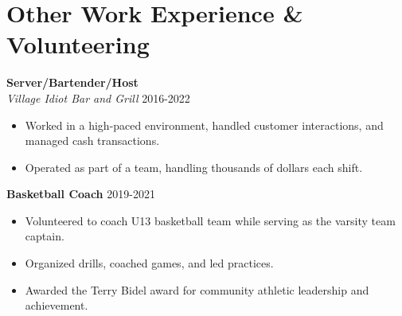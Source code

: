 \documentclass[a4paper,11pt]{article}
\begin{document}
\vspace{0.2cm}

\section*{Other Work Experience \& Volunteering}

\textbf{Server/Bartender/Host} \\
\textit{Village Idiot Bar and Grill} \hfill 2016-2022
\begin{itemize}[leftmargin=0.5cm]
    \item Worked in a high-paced environment, handled customer interactions, and managed cash transactions.
    \item Operated as part of a team, handling thousands of dollars each shift.
\end{itemize}

\textbf{Basketball Coach} \hfill 2019-2021
\begin{itemize}[leftmargin=0.5cm]
    \item Volunteered to coach U13 basketball team while serving as the varsity team captain.
    \item Organized drills, coached games, and led practices.
    \item Awarded the Terry Bidel award for community athletic leadership and achievement.
\end{itemize}
\end{document}
